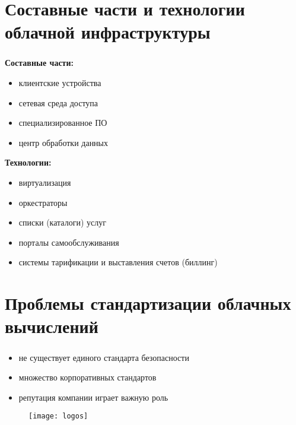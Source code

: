 
\section{Составные части и технологии облачной инфраструктуры}

\begin{frame}
\frametitle{\insertsection}

\textbf{Составные части:}
\begin{itemize}
    \item клиентские устройства
    \item сетевая среда доступа
    \item специализированное ПО
    \item центр обработки данных
\end{itemize}

\vspace{\baselineskip}

\textbf{Технологии:}
\begin{itemize}
    \item виртуализация
    \item оркестраторы
    \item списки (каталоги) услуг
    \item порталы самообслуживания
    \item системы тарификации и выставления счетов (биллинг)
\end{itemize}
\end{frame}


\section{Проблемы стандартизации облачных вычислений}

\begin{frame}
\frametitle{\insertsection}

\begin{itemize}
    \item не существует единого стандарта безопасности
    \item множество корпоративных стандартов
    \item репутация компании играет важную роль
\end{itemize}

\begin{figure}
    \center
    \texttt{[image: logos]}
\end{figure}
\end{frame}

